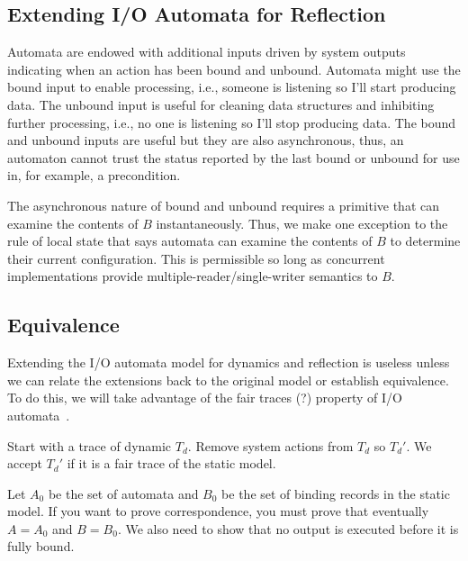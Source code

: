 \subsection{Extending I/O Automata for Reflection}

Automata are endowed with additional inputs driven by system outputs indicating when an action has been bound and unbound.
Automata might use the bound input to enable processing, i.e., someone is listening so I'll start producing data.
The unbound input is useful for cleaning data structures and inhibiting further processing, i.e., no one is listening so I'll stop producing data.
The bound and unbound inputs are useful but they are also asynchronous, thus, an automaton cannot trust the status reported by the last bound or unbound for use in, for example, a precondition.

The asynchronous nature of bound and unbound requires a primitive that can examine the contents of $B$ instantaneously.
Thus, we make one exception to the rule of local state that says automata can examine the contents of $B$ to determine their current configuration.
This is permissible so long as concurrent implementations provide multiple-reader/single-writer semantics to $B$.

\subsection{Equivalence}

Extending the I/O automata model for dynamics and reflection is useless unless we can relate the extensions back to the original model or establish equivalence.
To do this, we will take advantage of the fair traces (?) property of I/O automata~\cite{distributed_algorithms}.


Start with a trace of dynamic $T_d$.
Remove system actions from $T_d$ so $T_d'$.
We accept $T_d'$ if it is a fair trace of the static model.

Let $A_0$ be the set of automata and $B_0$ be the set of binding records in the static model.
If you want to prove correspondence, you must prove that eventually $A = A_0$ and $B = B_0$.
We also need to show that no output is executed before it is fully bound.



